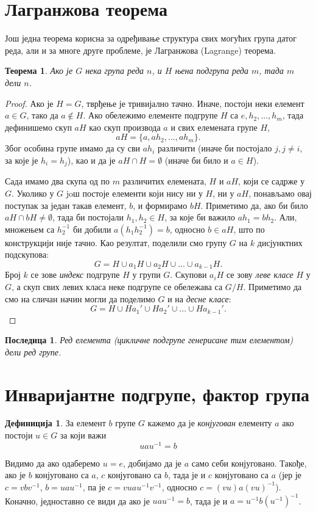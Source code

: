 \documentclass{report}
\theoremstyle{plain}
\newtheorem{thm}{Теорема}
\newtheorem*{cor}{Последица}
\theoremstyle{definition}
\newtheorem*{defn}{Дефиниција}
\begin{document}
\section{Лагранжова теорема}
Још једна теорема корисна за одређивање структура свих могућих група датог реда, али и за многе друге проблеме, је Лагранжова (Lagrange) теорема.
\begin{thm}
Ако је $G$ нека група реда $n$, и $H$ њена подгрупа реда $m$, тада $m$ дели $n$.
\end{thm}
\begin{proof}
Ако је $H=G$, тврђење је тривијално тачно. Иначе, постоји неки елемент $a\in G$, тако да $a\notin H$. Ако обележимо елементе подгрупе $H$ са $e, h_2, ..., h_m$, тада дефинишемо скуп $aH$ као скуп производа $a$ и свих елемената групе $H$,
$$aH = \{a, ah_2, ..., ah_m\}.$$
Због особина групе имамо да су сви $ah_i$ различити (иначе би постојало $j, j\neq i$, за које је $h_i=h_j$), као и да је $aH\cap H = \emptyset$ (иначе би било и $a\in H$).

Сада имамо два скупа од по $m$ различитих елемената, $H$ и $aH$, који се садрже у $G$. Уколико у $G$ joш постоје елементи који нису ни у $H$, ни у $aH$, понављамо овај поступак за један такав елемент, $b$, и формирамо $bH$. Приметимо да, ако би било $aH\cap bH \not= \emptyset$, тада би постојали $h_1, h_2\in H$, за које би важило $ah_1 = bh_2$. Али, множењем са $h_2^{-1}$ би добили $a(h_1h_2^{-1}) = b$, односно $b\in aH$, што по конструкцији није тачно. Као резултат, поделили смо групу $G$ на $k$ дисјунктних подскупова:
$$G = H \cup a_1 H \cup a_2 H \cup ... \cup a_{k-1} H.$$
Број $k$ се зове \emph{индекс} подгрупе $H$ у групи $G$. Скупови $a_i H$ се зову \emph{леве класе} $H$ у $G$, а скуп свих левих класа неке подгрупе се обележава са $G/H$. Приметимо да смо на сличан начин могли да поделимо $G$ и на \emph{десне класе}:
$$G = H \cup Ha_1'  \cup Ha_2' \cup ... \cup Ha_{k-1}'.$$
\end{proof}
\begin{cor}
Ред елемента (цикличне подгрупе генерисане тим елементом) дели ред групе.
\end{cor}

\section{Инваријантне подгрупе, фактор група}
\begin{defn}
За елемент $b$ групе $G$ кажемо да је \emph{конјугован} елементу $a$ ако постоји $u\in G$ за који важи
$$u a u^{-1} = b$$
\end{defn}
Видимо да ако одаберемо $u = e$, добијамо да је $a$ само себи конјуговано. Такође, ако је $b$ конјуговано са $a$, $c$ конјуговано са $b$, тада је и $c$ конјуговано са $a$ (јер је $c = vbv^{-1}$, $b = uau^{-1}$, па је $c = vuau^{-1}v^{-1}$, односно $c = (vu)a(vu)^{-1}$). Коначно, једноставно се види да ако је $u a u^{-1} = b$, тада је и $a = u^{-1} b (u^{-1})^{-1}$.
\end{document}

